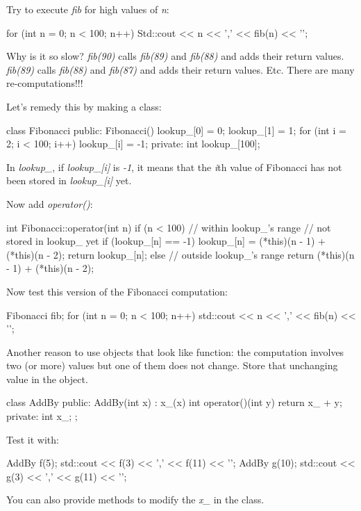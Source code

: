 Try to execute \textit{fib} for high values of \textit{n}:

\begin{consolethree}[escapeinside=||]
for (int n = 0; n < 100; n++)
{
    Std::cout << n << ',' << fib(n) << '\n';
}
\end{consolethree}

Why is it so slow? \textit{fib(90)} calls \textit{fib(89)} and
\textit{fib(88)} and adds their return values. \textit{fib(89)} calls
\textit{fib(88)} and \textit{fib(87)} and adds their return values. Etc.
There are many re-computations!!!

Let's remedy this by making a class:

\begin{consolethree}[escapeinside=||]
class Fibonacci
{
public:
    Fibonacci()
    {
        lookup_[0] = 0;
        lookup_[1] = 1;
        for (int i = 2; i < 100; i++)
        {
            lookup_[i] = -1;
        }
    }
private:
    int lookup_[100];
}
\end{consolethree}

In \textit{lookup\_}, if \textit{lookup\_[i]} is \textit{-1}, it means
that the \textit{i}th value of Fibonacci has not been stored in
\textit{lookup\_[i]} yet.

Now add \textit{operator()}:

\begin{consolethree}[escapeinside=||]
int Fibonacci::operator(int n)
{
    if (n < 100) // within lookup_'s range
    {
        // not stored in lookup_ yet
        if (lookup_[n] == -1)
            lookup_[n] = (*this)(n - 1) + (*this)(n - 2);
        return lookup_[n];
    }
    else // outside lookup_'s range
    {
        return (*this)(n - 1) + (*this)(n - 2);
    }
}
\end{consolethree}

Now test this version of the Fibonacci computation:

\begin{consolethree}[escapeinside=||]
Fibonacci fib;
for (int n = 0; n < 100; n++)
{
    std::cout << n << ',' << fib(n) << '\n';
}
\end{consolethree}

Another reason to use objects that look like function: the computation
involves two (or more) values but one of them does not change. Store
that unchanging value in the object.

\begin{consolethree}[escapeinside=||]
class AddBy
{
public:
    AddBy(int x) : x_(x) {}
    int operator()(int y) { return x_ + y; }
private:
    int x_;
};
\end{consolethree}

Test it with:

\begin{consolethree}[escapeinside=||]
AddBy f(5);
std::cout << f(3) << ',' << f(11) << '\n';
AddBy g(10);
std::cout << g(3) << ',' << g(11) << '\n';
\end{consolethree}

You can also provide methods to modify the \textit{x\_} in the class.


